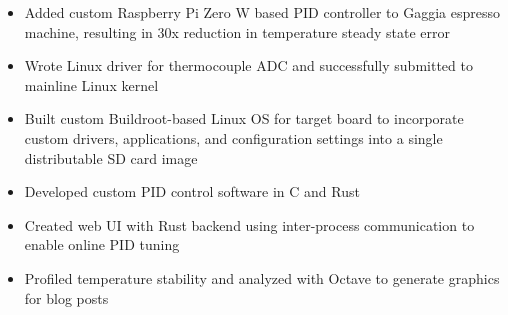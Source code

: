 \begin{itemize}
    \item Added custom Raspberry Pi Zero W based PID controller to Gaggia espresso machine, resulting in 30x reduction in temperature steady state error
    \item Wrote Linux driver for thermocouple ADC and successfully submitted to mainline Linux kernel
    \item Built custom Buildroot-based Linux OS for target board to incorporate custom drivers, applications, and configuration settings into a single distributable SD card image
    \item Developed custom PID control software in C and Rust
    \item Created web UI with Rust backend using inter-process communication to enable online PID tuning
    \item Profiled temperature stability and analyzed with Octave to generate graphics for blog posts
\end{itemize}
